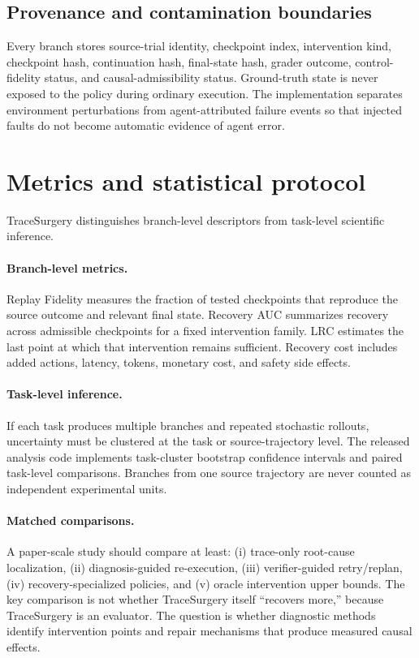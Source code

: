 \documentclass{article}
\begin{document}
\subsection{Provenance and contamination boundaries}
Every branch stores source-trial identity, checkpoint index, intervention kind, checkpoint hash, continuation hash, final-state hash, grader outcome, control-fidelity status, and causal-admissibility status. Ground-truth state is never exposed to the policy during ordinary execution. The implementation separates environment perturbations from agent-attributed failure events so that injected faults do not become automatic evidence of agent error.

\section{Metrics and statistical protocol}

TraceSurgery distinguishes branch-level descriptors from task-level scientific inference.

\paragraph{Branch-level metrics.}
Replay Fidelity measures the fraction of tested checkpoints that reproduce the source outcome and relevant final state. Recovery AUC summarizes recovery across admissible checkpoints for a fixed intervention family. LRC estimates the last point at which that intervention remains sufficient. Recovery cost includes added actions, latency, tokens, monetary cost, and safety side effects.

\paragraph{Task-level inference.}
If each task produces multiple branches and repeated stochastic rollouts, uncertainty must be clustered at the task or source-trajectory level. The released analysis code implements task-cluster bootstrap confidence intervals and paired task-level comparisons. Branches from one source trajectory are never counted as independent experimental units.

\paragraph{Matched comparisons.}
A paper-scale study should compare at least: (i) trace-only root-cause localization, (ii) diagnosis-guided re-execution, (iii) verifier-guided retry/replan, (iv) recovery-specialized policies, and (v) oracle intervention upper bounds. The key comparison is not whether TraceSurgery itself ``recovers more,'' because TraceSurgery is an evaluator. The question is whether diagnostic methods identify intervention points and repair mechanisms that produce measured causal effects.
\end{document}
